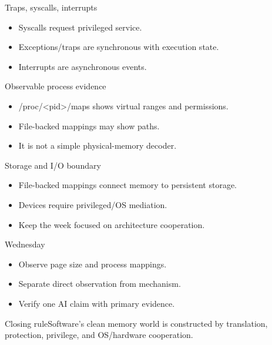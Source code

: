 \documentclass{beamer}
\begin{document}
\begin{frame}{Traps, syscalls, interrupts}\begin{itemize}\item Syscalls request privileged service.\item Exceptions/traps are synchronous with execution state.\item Interrupts are asynchronous events.\end{itemize}\end{frame}
\begin{frame}{Observable process evidence}\begin{itemize}\item /proc/<pid>/maps shows virtual ranges and permissions.\item File-backed mappings may show paths.\item It is not a simple physical-memory decoder.\end{itemize}\end{frame}
\begin{frame}{Storage and I/O boundary}\begin{itemize}\item File-backed mappings connect memory to persistent storage.\item Devices require privileged/OS mediation.\item Keep the week focused on architecture cooperation.\end{itemize}\end{frame}
\begin{frame}{Wednesday}\begin{itemize}\item Observe page size and process mappings.\item Separate direct observation from mechanism.\item Verify one AI claim with primary evidence.\end{itemize}\end{frame}
\begin{frame}{Closing rule}\centering\Large Software's clean memory world is constructed by translation, protection, privilege, and OS/hardware cooperation.\end{frame}
\end{document}
